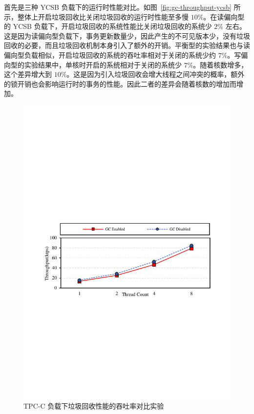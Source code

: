 首先是三种 YCSB 负载下的运行时性能对比。如图~\ref{fig:gc-throughput-ycsb} 所示，整体上开启垃圾回收比关闭垃圾回收的运行时性能至多慢 $10\%$。在读偏向型的 YCSB 负载下，开启垃圾回收的系统性能比关闭垃圾回收的系统少 $2\%$ 左右。这是因为读偏向型负载下，事务更新数量少，因此产生的不可见版本少，没有垃圾回收的必要，而且垃圾回收机制本身引入了额外的开销。平衡型的实验结果也与读偏向型负载相似，开启垃圾回收的系统的吞吐率相对于关闭的系统少约 $7\%$。写偏向型的实验结果中，单核时开启的系统相对于关闭的系统少 $7\%$。随着核数增多，这个差异增大到 $10\%$。这是因为引入垃圾回收会增大线程之间冲突的概率，额外的锁开销也会影响运行时的事务的性能。因此二者的差异会随着核数的增加而增加。


\begin{figure}
    \centering
    \includegraphics[width=15cm, trim={1cm 9cm 1cm 10cm}]{figures/gc-tpcc-throughput.pdf}
    \caption{TPC-C 负载下垃圾回收性能的吞吐率对比实验}
    \label{fig:gc-throughput-tpcc}
\end{figure}

